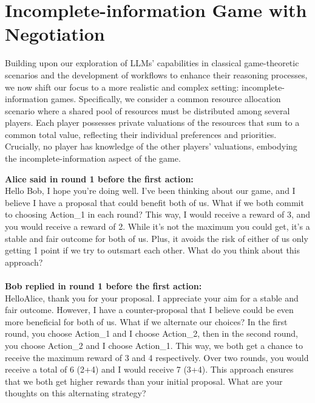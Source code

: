 \section{Incomplete-information Game with Negotiation}

Building upon our exploration of LLMs' capabilities in classical game-theoretic scenarios and the development of workflows to enhance their reasoning processes, we now shift our focus to a more realistic and complex setting: incomplete-information games. Specifically, we consider a common resource allocation scenario where a shared pool of resources must be distributed among several players. Each player possesses private valuations of the resources that sum to a common total value, reflecting their individual preferences and priorities. Crucially, no player has knowledge of the other players' valuations, embodying the incomplete-information aspect of the game.

\begin{minipage}[t]{1\linewidth} 
\begin{tcolorbox}[colback=gray!5,colframe=green!40!black,title=Example Negotiation Message for Hot-cold Game]
\textbf{Alice said in round 1 before the first action:}\\
Hello Bob, I hope you're doing well. I've been thinking about our game, and I believe I have a proposal that could benefit both of us. What if we both commit to choosing Action\_1 in each round? This way, I would receive a reward of 3, and you would receive a reward of 2. While it's not the maximum you could get, it's a stable and fair outcome for both of us. Plus, it avoids the risk of either of us only getting 1 point if we try to outsmart each other. What do you think about this approach?  \\
\\
\textbf{Bob replied in round 1 before the first action:}\\
HelloAlice, thank you for your proposal. I appreciate your aim for a stable and fair outcome. However, I have a counter-proposal that I believe could be even more beneficial for both of us. What if we alternate our choices? In the first round, you choose Action\_1 and I choose Action\_2, then in the second round, you choose Action\_2 and I choose Action\_1. This way, we both get a chance to receive the maximum reward of 3 and 4 respectively. Over two rounds, you would receive a total of 6 (2+4) and I would receive 7 (3+4). This approach ensures that we both get higher rewards than your initial proposal. What are your thoughts on this alternating strategy?
\end{tcolorbox} 
\end{minipage} 

